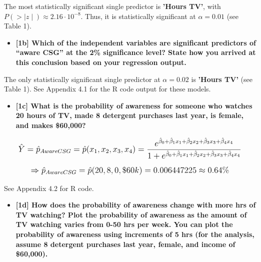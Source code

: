 \documentclass[10pt, oneside,spanish]{article}
\begin{document}
\medskip





The most statistically significant single predictor is \textbf{'Hours TV'}, with $P(>\mid z \mid ) \approx 2.16 \cdot 10^{-8} $. Thus, it is statistically significant at $\alpha = 0.01$ (see Table 1).

\begin{itemize}
\item \textbf{[1b] Which of the independent variables are significant predictors of “aware CSG” at the 2\% significance level?  State how you arrived at this conclusion based on your regression output.}
\end{itemize}

The only statistically significant single predictor at $\alpha = 0.02$ is \textbf{'Hours TV'} (see Table 1). See Appendix 4.1 for the R code output for these models.







\begin{itemize}
\item \textbf{[1c] What is the probability of awareness for someone who watches 20 hours of TV, made 8 detergent purchases last year, is female, and makes \$60,000? }
\end{itemize}

$$  \mathlarger{ \hat{Y} = \hat{p}_{AwareCSG} = \hat{p}(x_1,x_2,x_3,x_4) = \frac{e^{\hat{\beta}_0 + \hat{\beta}_1 x_1 + \hat{\beta}_2 x_2 + \hat{\beta}_3 x_3 + \hat{\beta}_4 x_4 }}{1 + e^{\hat{\beta}_0 + \hat{\beta}_1 x_1 + \hat{\beta}_2 x_2 + \hat{\beta}_3 x_3 + \hat{\beta}_4 x_4 }}}$$

$$  \mathlarger{ \Rightarrow \hat{p}_{AwareCSG} = \hat{p}(20,8,0,\$60k) = 0.006447225 \approx 0.64\% }$$

See Appendix 4.2 for R code.

\pagebreak

\begin{itemize}
\item \textbf{[1d] How does the probability of awareness change with more hrs of TV watching? Plot the probability of awareness as the amount of TV watching varies from 0-50 hrs per week. You can plot the probability of awareness using increments of 5 hrs (for the analysis, assume 8 detergent purchases last year, female, and income of \$60,000).  } 
\end{itemize}
\end{document}

